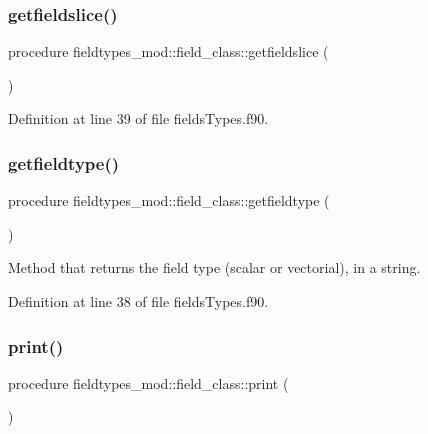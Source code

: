 \subsubsection{\texorpdfstring{getfieldslice()}{getfieldslice()}}
{\footnotesize\ttfamily procedure fieldtypes\+\_\+mod\+::field\+\_\+class\+::getfieldslice (\begin{DoxyParamCaption}{ }\end{DoxyParamCaption})\hspace{0.3cm}{\ttfamily [private]}}



Definition at line 39 of file fields\+Types.\+f90.

\mbox{\label{structfieldtypes__mod_1_1field__class_a8474f700cf545721b177e1fc91020fd7}} 
\subsubsection{\texorpdfstring{getfieldtype()}{getfieldtype()}}
{\footnotesize\ttfamily procedure fieldtypes\+\_\+mod\+::field\+\_\+class\+::getfieldtype (\begin{DoxyParamCaption}{ }\end{DoxyParamCaption})\hspace{0.3cm}{\ttfamily [private]}}



Method that returns the field type (scalar or vectorial), in a string. 



Definition at line 38 of file fields\+Types.\+f90.

\mbox{\label{structfieldtypes__mod_1_1field__class_afaab58efcda61608934254b6b4d85ed5}} 
\subsubsection{\texorpdfstring{print()}{print()}}
{\footnotesize\ttfamily procedure fieldtypes\+\_\+mod\+::field\+\_\+class\+::print (\begin{DoxyParamCaption}{ }\end{DoxyParamCaption})\hspace{0.3cm}{\ttfamily [private]}}



